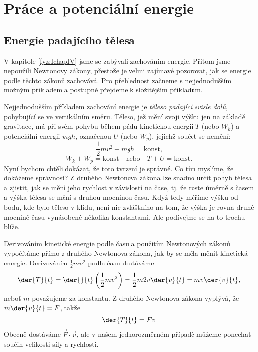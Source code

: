 \setchaptertoc
\chapter{Práce a potenciální energie}\label{fyz:IchapXIII}
  \section{Energie padajícího tělesa}
    V kapitole \ref{fyz:IchapIV} jsme se zabývali zachováním energie. Přitom jsme nepoužili 
    Newtonovy zákony, přestože je velmi zajímavé pozorovat, jak se energie podle těchto zákonů 
    zachovává. Pro přehlednost začneme s nejjednodušším možným příkladem a postupně přejdeme k 
    složitějším příkladům.
    
    Nejjednodušším příkladem zachování energie je \emph{těleso padající svisle dolů}, pohybující se 
    ve vertikálním směru. Těleso, jež mění svoji výšku jen na základě gravitace, má při svém pohybu 
    během pádu kinetickou energii \(T\) (nebo \(W_k\)) a potenciální energii \(mgh\), označenou 
    \(U\) (nebo \(W_p\)), jejichž součet se nemění:
    \begin{equation}\label{fyz:eq025}
      \frac{1}{2}mv^2 + mgh = \text{konst,}
    \end{equation}
    \begin{equation*}
      W_k + W_p = \text{konst} \quad \text{nebo} \quad T + U = \text{konst}.
    \end{equation*}
    Nyní bychom chtěli dokázat, že toto tvrzení je správné. Co tím myslíme, že dokážeme správnost? 
    Z druhého Newtonova zákona lze snadno určit pohyb tělesa a zjistit, jak se mění jeho rychlost v 
    závislostí na čase, tj. že roste úměrně s časem a výška tělesa se mění s druhou mocninou času. 
    Když tedy měříme výšku od bodu, kde bylo těleso v klidu, není nic zvláštního na tom, že výška 
    je rovna druhé mocnině času vynásobené několika konstantami. Ale podívejme se na to trochu 
    blíže.
    
    Derivováním kinetické energie podle času a použitím Newtonových zákonů vypočítáme přímo z 
    druhého Newtonova zákona, jak by se měla měnit kinetická energie. Derivováním 
    \(\frac{1}{2}mv^2\) podle času dostáváme
    \begin{equation}\label{fyz:eq026}
      \der{T}{t} = \der{ }{t}\left(\frac{1}{2}mv^2\right) = \frac{1}{2}m2v\der{v}{t} 
                 = mv\der{v}{t},
    \end{equation}
    neboť \(m\) považujeme za konstantu. Z druhého Newtonova zákona vyplývá, že \(m\der{v}{t} = 
    F\), takže
    \begin{equation}\label{fyz:eq027}
      \der{T}{t} =Fv
    \end{equation}
    Obecně dostáváme \(\vec{F}\cdot\vec{v}\), ale v našem jednorozměrném případě můžeme ponechat 
    součin velikosti síly a rychlosti. 
    
